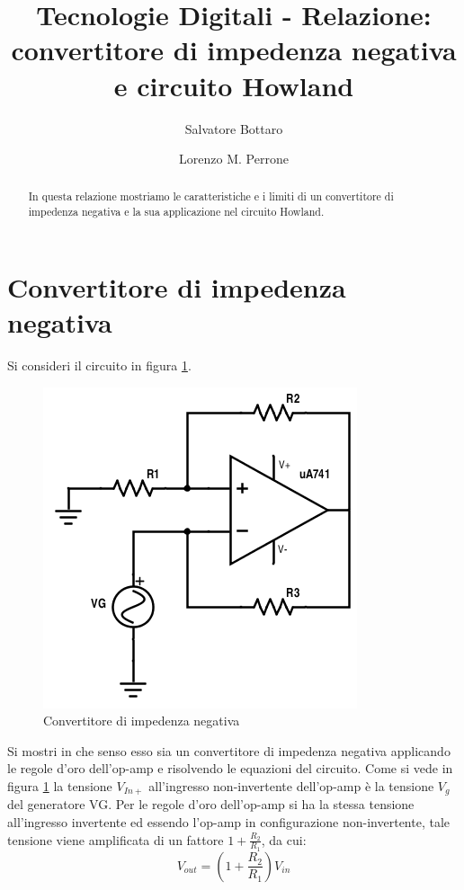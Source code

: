 \documentclass[journal, a4paper]{IEEEtran}
\begin{document}
	\title{Tecnologie Digitali - Relazione: convertitore di impedenza negativa e circuito Howland}
	\author[1]{Salvatore Bottaro}
		\author[2]{Lorenzo M. Perrone}
	\maketitle

\begin{abstract}
In questa relazione mostriamo le caratteristiche e i limiti di un convertitore di impedenza negativa e la sua applicazione nel circuito Howland.
\end{abstract}

\section{Convertitore di impedenza negativa}
Si consideri il circuito in figura \ref{fig:negimp}.

\begin{figure}[htp]
\centering
\includegraphics[scale=.5]{negative-impedance-converter}
\caption{Convertitore di impedenza negativa}
\label{fig:negimp}
\end{figure}

Si mostri in che senso esso sia un convertitore di impedenza negativa applicando le regole d'oro dell'op-amp e risolvendo le equazioni del circuito. Come si vede in figura \ref{fig:negimp} la tensione $V_{In+}$ all'ingresso non-invertente dell'op-amp è la tensione $V_g$ del generatore VG. Per le regole d'oro dell'op-amp si ha la stessa tensione all'ingresso invertente ed essendo l'op-amp in configurazione non-invertente, tale tensione viene amplificata di un fattore $1+\frac{R_2}{R_1}$, da cui:
\begin{equation}
V_{out} = (1+\frac{R_2}{R_1})V_{in}
\label{eqn:amp}
\end{equation}
\end{document}
